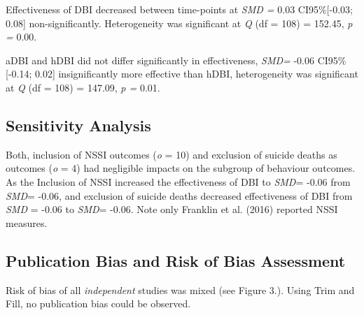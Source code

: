 \documentclass[
  english,
  man]{apa6}
\begin{document}
Effectiveness of DBI decreased between time-points at \emph{SMD =} 0.03 CI95\%{[}-0.03; 0.08{]} non-significantly. Heterogeneity was significant at \emph{Q} (df = 108) = 152.45, \emph{p =} 0.00.

aDBI and hDBI did not differ significantly in effectiveness, \emph{SMD=} -0.06 CI95\%{[}-0.14; 0.02{]} insignificantly more effective than hDBI, heterogeneity was significant at \emph{Q} (df = 108) = 147.09, \emph{p =} 0.01.

\hypertarget{sensitivity-analysis-1}{%
\subsection{Sensitivity Analysis}\label{sensitivity-analysis-1}}

Both, inclusion of NSSI outcomes (\emph{o} = 10) and exclusion of suicide deaths as outcomes (\emph{o} = 4) had negligible impacts on the subgroup of behaviour outcomes. As the Inclusion of NSSI increased the effectiveness of DBI to \emph{SMD}= -0.06 from \emph{SMD}= -0.06, and exclusion of suicide deaths decreased effectiveness of DBI from \emph{SMD} = -0.06 to \emph{SMD}= -0.06. Note only Franklin et al. (2016) reported NSSI measures.

\hypertarget{publication-bias-and-risk-of-bias-assessment}{%
\subsection{Publication Bias and Risk of Bias Assessment}\label{publication-bias-and-risk-of-bias-assessment}}

Risk of bias of all \emph{independent} studies was mixed (see Figure 3.). Using Trim and Fill, no publication bias could be observed.
\end{document}
